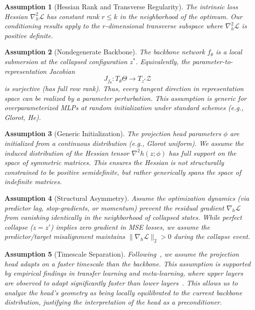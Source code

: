 \documentclass{article}
\theoremstyle{plain}
\newtheorem{assumption}{Assumption}
\theoremstyle{definition}
\theoremstyle{remark}
\begin{document}
\begin{assumption}[Hessian Rank and Transverse Regularity]
\label{ass:hessian-rank}
The intrinsic loss Hessian $\nabla_h^2\mathcal{L}$ has constant rank $r \le k$ in the neighborhood of the optimum. Our conditioning results apply to the $r$-dimensional transverse subspace where $\nabla_h^2\mathcal{L}$ is positive definite.
\end{assumption}

\begin{assumption}[Nondegenerate Backbone]
\label{ass:backbone-rank}
The backbone network $f_\theta$ is a local submersion at the collapsed configuration $z^*$.
Equivalently, the parameter-to-representation Jacobian
\begin{equation*}
    J_{f_\theta} : T_\theta \Theta \to T_{z^*} \mathcal{Z}
\end{equation*}
is surjective (has full row rank). Thus, every tangent direction in representation space can be realized by a parameter perturbation. This assumption is generic for overparameterized MLPs at random initialization under standard schemes (e.g., Glorot, He).
\end{assumption}

\begin{assumption}[Generic Initialization]
\label{ass:generic-init}
The projection head parameters $\phi$ are initialized from a continuous distribution (e.g., Glorot uniform). We assume the induced distribution of the Hessian tensor $\nabla^2 h(z; \phi)$ has full support on the space of symmetric matrices. This ensures the Hessian is not structurally constrained to be positive semidefinite, but rather generically spans the space of indefinite matrices.
\end{assumption}

\begin{assumption}[Structural Asymmetry]
\label{ass:asymmetry}
Assume the optimization dynamics (via predictor lag, stop-gradients, or momentum) prevent the residual gradient $\nabla_h \mathcal{L}$ from vanishing identically in the neighborhood of collapsed states. While perfect collapse ($z=z'$) implies zero gradient in MSE losses, we assume the predictor/target misalignment maintains $\|\nabla_h \mathcal{L}\|_2 > 0$ during the collapse event.
\end{assumption}

\begin{assumption}[Timescale Separation]
\label{ass:timescale}
Following~\citet{tian2021understanding}, we assume the projection head adapts on a faster timescale than the backbone. This assumption is supported by empirical findings in transfer learning and meta-learning, where upper layers are observed to adapt significantly faster than lower layers~\citep{raghu2020rapid, fort2020deeplearningversuskernel}. This allows us to analyze the head's geometry as being locally equilibrated to the current backbone distribution, justifying the interpretation of the head as a preconditioner.
\end{assumption}
\end{document}
